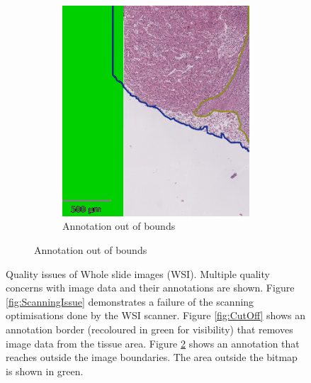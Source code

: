 \begin{figure}[h!t]
\begin{subfigure}[b]{0.36\textwidth}
\begin{subfigure}[b]{\textwidth}
        \includegraphics[width=\textwidth]{latex/QuPathScreenshots/AnnotationOutsideSmall.png}
        \caption{Annotation out of bounds}
        \label{fig:OOB}
      \end{subfigure}
    \end{subfigure}
    \caption[Whole slide image quality]{Quality issues of Whole slide images (WSI). Multiple quality concerns with image data and their annotations are shown. Figure \ref{fig:ScanningIssue} demonstrates a failure of the scanning optimisations done by the WSI scanner. Figure \ref{fig:CutOff} shows an annotation border (recoloured in green for visibility) that removes image data from the tissue area. Figure \ref{fig:OOB} shows an annotation that reaches outside the image boundaries. The area outside the bitmap is shown in green.}
    \label{fig:shitshow}
  \end{figure}

